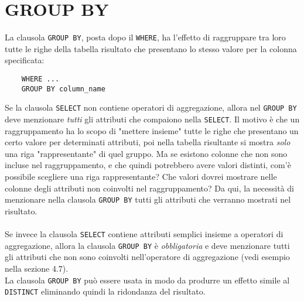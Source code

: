 \documentclass[12pt,a4paper]{book}
\begin{document}
	\section{GROUP BY}
	La clausola \texttt{GROUP BY}, posta dopo il \texttt{WHERE}, ha l'effetto di raggruppare tra loro tutte le righe della tabella risultato che presentano lo stesso valore per la colonna specificata:
	\begin{lstlisting}
	WHERE ...
	GROUP BY column_name
	\end{lstlisting}
	Se la clausola \texttt{SELECT} non contiene operatori di aggregazione, allora nel \texttt{GROUP BY} deve menzionare \textit{tutti} gli attributi che compaiono nella \texttt{SELECT}. Il motivo è che un raggruppamento ha lo scopo di "mettere insieme" tutte le righe che presentano un certo valore per determinati attributi, poi nella tabella risultante si mostra \textit{solo} una riga "rappresentante" di quel gruppo. Ma se esistono colonne che non sono incluse nel raggruppamento, e che quindi potrebbero avere valori distinti, com'è possibile scegliere una riga rappresentante? Che valori dovrei mostrare nelle colonne degli attributi non coinvolti nel raggruppamento? Da qui, la necessità di menzionare nella clausola \texttt{GROUP BY} tutti gli attributi che verranno mostrati nel risultato.\\ \\
	Se invece la clausola \texttt{SELECT} contiene attributi semplici insieme a operatori di aggregazione, allora la clausola \texttt{GROUP BY} è \textit{obbligatoria} e deve menzionare tutti gli attributi che non sono coinvolti nell'operatore di aggregazione (vedi esempio nella sezione 4.7).\\La clausola \texttt{GROUP BY} può essere usata in modo da produrre un effetto simile al \texttt{DISTINCT} eliminando quindi la ridondanza del risultato.\\
\end{document}
